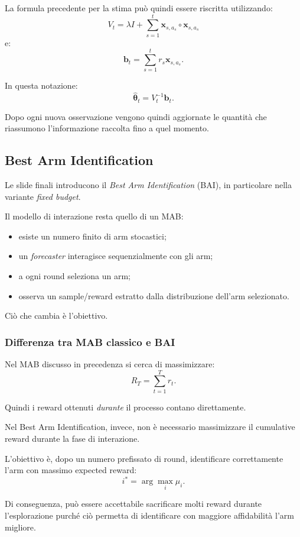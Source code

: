 La formula precedente per la stima può quindi essere riscritta utilizzando:
\[
V_t
=
\lambda I
+
\sum_{s=1}^{t}
\mathbf{x}_{s,a_s}
\circ
\mathbf{x}_{s,a_s}
\]
e:
\[
\mathbf{b}_t
=
\sum_{s=1}^{t}
r_s\mathbf{x}_{s,a_s}.
\]

In questa notazione:
\[
\widehat{\boldsymbol{\theta}}_t
=
V_t^{-1}\mathbf{b}_t.
\]

Dopo ogni nuova osservazione vengono quindi aggiornate le quantità che riassumono l'informazione raccolta fino a quel momento.

\newpage

\subsection{Best Arm Identification}

Le slide finali introducono il \emph{Best Arm Identification} (BAI), in particolare nella variante \emph{fixed budget}.

Il modello di interazione resta quello di un MAB:
\begin{itemize}
    \item esiste un numero finito di arm stocastici;
    \item un \emph{forecaster} interagisce sequenzialmente con gli arm;
    \item a ogni round seleziona un arm;
    \item osserva un sample/reward estratto dalla distribuzione dell'arm selezionato.
\end{itemize}

Ciò che cambia è l'obiettivo.

\subsubsection{Differenza tra MAB classico e BAI}

Nel MAB discusso in precedenza si cerca di massimizzare:
\[
R_T=
\sum_{t=1}^{T}r_t.
\]

Quindi i reward ottenuti \emph{durante} il processo contano direttamente.

Nel Best Arm Identification, invece, non è necessario massimizzare il cumulative reward durante la fase di interazione.

L'obiettivo è, dopo un numero prefissato di round, identificare correttamente l'arm con massimo expected reward:
\[
i^*
=
\arg\max_i\mu_i.
\]

Di conseguenza, può essere accettabile sacrificare molti reward durante l'esplorazione purché ciò permetta di identificare con maggiore affidabilità l'arm migliore.

